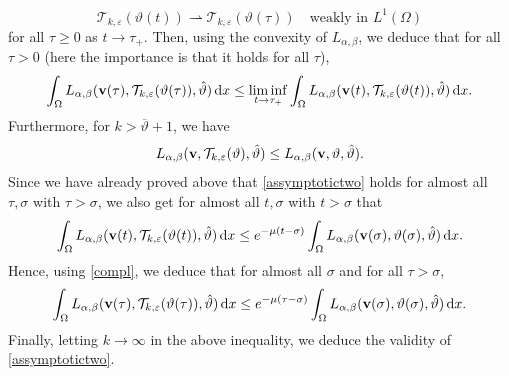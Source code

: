 \documentclass[11pt, a4paper, reqno]{amsart}
\numberwithin{equation}{section}
\newcommand{\thetah}{\hat\thet}
\newcommand{\vc}[1]{{\bf #1}}
\newcommand{\vv}{\vc{v}}
\newcommand{\thet}{\vartheta}
\newcommand{\dx}{\,{\rm d} {x}}
\newcommand{\intO}[1]{\int_{\Omega} #1 \dx}
\newcommand{\Lab}{L_{\alpha,\beta}}
\begin{document}
$$
\mathcal{T}_{k,\varepsilon}(\thet(t)) \rightharpoonup \mathcal{T}_{k,\varepsilon}(\thet(\tau)) \quad \text{weakly in } L^1(\Omega)
$$
for all $\tau \ge 0$ as $t \to \tau_+$. Then, using the convexity of $\Lab$, we deduce that for all $\tau > 0$ (here the importance is that it holds for all $\tau$),
\begin{equation}\label{compl}
\intO{\Lab(\vv(\tau), \mathcal{T}_{k,\varepsilon}(\thet(\tau)), \thetah)} \leq \liminf_{t \to \tau_+} \intO{\Lab(\vv(t), \mathcal{T}_{k,\varepsilon}(\thet(t)), \thetah)}.
\end{equation}
Furthermore, for $k > \overline{\thet} + 1$, we have
$$
\Lab(\vv, \mathcal{T}_{k,\varepsilon}(\thet), \thetah) \le \Lab(\vv, \thet, \thetah).
$$
Since we have already proved above that \eqref{assymptotictwo} holds for almost all $\tau, \sigma$ with $\tau > \sigma$, we also get for almost all $t, \sigma$ with $t > \sigma$ that 
\begin{equation}\label{assymptotictwoQ}
\intO{\Lab(\vv(t), \mathcal{T}_{k,\varepsilon}(\thet(t)), \thetah)} \leq e^{-\mu (t-\sigma)} \intO{\Lab(\vv(\sigma), \thet(\sigma), \thetah)}.
\end{equation}
Hence, using \eqref{compl}, we deduce that for almost all $\sigma$ and for all $\tau > \sigma$,
\begin{equation}\label{assymptotictwoQP}
\intO{\Lab(\vv(\tau), \mathcal{T}_{k,\varepsilon}(\thet(\tau)), \thetah)} \leq e^{-\mu (\tau-\sigma)} \intO{\Lab(\vv(\sigma), \thet(\sigma), \thetah)}.
\end{equation}
Finally, letting $k \to \infty$ in the above inequality, we deduce the validity of \eqref{assymptotictwo}.
\end{document}
